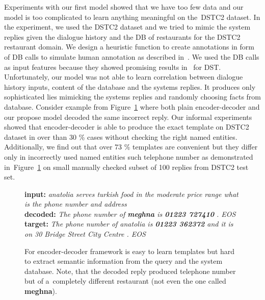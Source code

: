 \documentclass[11pt]{article}
\begin{document}
Experiments with our first model showed that we have too few data and our model is too complicated to learn anything meaningful on the~DSTC2 dataset.
In the experiment, we used the DSTC2 dataset and we tried to mimic the system replies given the dialogue history and the DB of restaurants for the DSTC2 restaurant domain.
We design a heuristic function to create annotations in form of DB calls to simulate human annotation as described in~\cite{platek2016wochat}.
We used the DB calls as input features because they showed promising results in~\cite{platek_recurrent_2016} for DST.
Unfortunately, our model was not able to learn correlation between dialogue history inputs, content of the database and the systems replies.
It produces only sophisticated lies mimicking the systems replies and randomly choosing facts from database.
Consider example from Figure~\ref{fig:encdec_lies} where both plain encoder-decoder and our propose model decoded the same incorrect reply.
Our informal experiments showed that encoder-decoder is able to produce the exact template on DSTC2 dataset in over than 30 \% cases without checking the right named entities.
Additionally, we find out that over 73 \% templates are convenient but they differ only in incorrectly used named entities such telephone number as demonstrated in~Figure~\ref{fig:encdec_lies} on small manually checked subset of 100 replies from DSTC2 test set.
\begin{figure}[!ht]
    {\bf input:} {\it anatolia serves turkish food in the moderate price range what is the phone number and address} \\
    {\bf decoded:} {\it The phone number of {\bf meghna} is {\bf 01223 727410} . EOS} \\
    {\bf target:} {\it The phone number of anatolia is {\bf 01223 362372} and it is on 30 Bridge Street City Centre . EOS } \\
    \caption{For encoder-decoder framework is easy to learn templates but hard to extract semantic information from the query and the system database. Note, that the decoded reply produced telephone number but of a~completely different restaurant (not even the one called {\bf meghna}).}
\label{fig:encdec_lies}
\end{figure}
\end{document}
